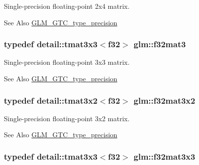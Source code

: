 Single-\/precision floating-\/point 2x4 matrix. 

\begin{DoxySeeAlso}{See Also}
\hyperlink{group__gtc__type__precision}{G\-L\-M\-\_\-\-G\-T\-C\-\_\-type\-\_\-precision} 
\end{DoxySeeAlso}
\hypertarget{group__gtc__type__precision_gadc036a0da6d6b14996ece8884896a0e6}{
\subsubsection[{f32mat3}]{\setlength{\rightskip}{0pt plus 5cm}typedef detail\-::tmat3x3$<$f32$>$ {\bf glm\-::f32mat3}}}\label{group__gtc__type__precision_gadc036a0da6d6b14996ece8884896a0e6}


Single-\/precision floating-\/point 3x3 matrix. 

\begin{DoxySeeAlso}{See Also}
\hyperlink{group__gtc__type__precision}{G\-L\-M\-\_\-\-G\-T\-C\-\_\-type\-\_\-precision} 
\end{DoxySeeAlso}
\hypertarget{group__gtc__type__precision_gadf01336f427b8b6918bcad610cfc2fd6}{
\subsubsection[{f32mat3x2}]{\setlength{\rightskip}{0pt plus 5cm}typedef detail\-::tmat3x2$<$f32$>$ {\bf glm\-::f32mat3x2}}}\label{group__gtc__type__precision_gadf01336f427b8b6918bcad610cfc2fd6}


Single-\/precision floating-\/point 3x2 matrix. 

\begin{DoxySeeAlso}{See Also}
\hyperlink{group__gtc__type__precision}{G\-L\-M\-\_\-\-G\-T\-C\-\_\-type\-\_\-precision} 
\end{DoxySeeAlso}
\hypertarget{group__gtc__type__precision_ga5784742e2a453a8df85e7453a1386189}{
\subsubsection[{f32mat3x3}]{\setlength{\rightskip}{0pt plus 5cm}typedef detail\-::tmat3x3$<$f32$>$ {\bf glm\-::f32mat3x3}}}\label{group__gtc__type__precision_ga5784742e2a453a8df85e7453a1386189}


